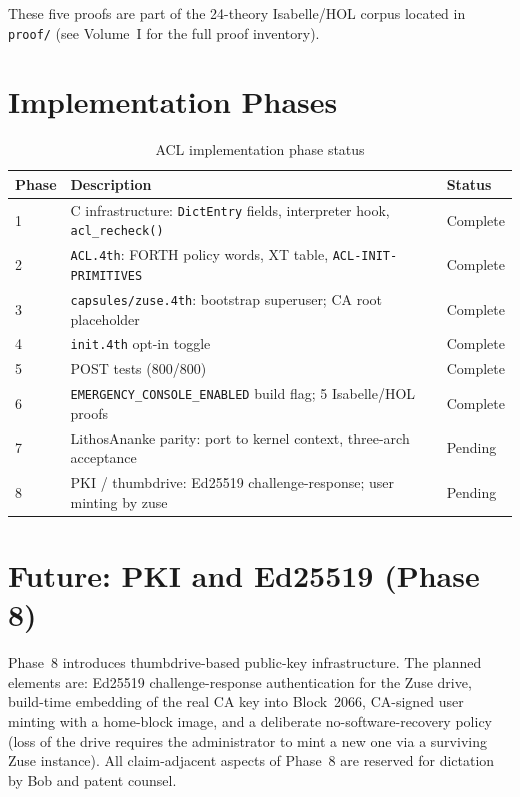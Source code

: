 These five proofs are part of the 24-theory Isabelle/HOL corpus located in
\texttt{proof/} (see Volume~I for the full proof inventory).

\section{Implementation Phases}
\label{vol2:sec:acl:phases}


\begin{table}[ht]
  \centering
  \caption{ACL implementation phase status}
  \label{tab:acl-phases}
  \begin{tabular}{lll}
    \toprule
    Phase & Description & Status \\
    \midrule
    1 & C infrastructure: \texttt{DictEntry} fields, interpreter hook,
        \texttt{acl\_recheck()} & Complete \\
    2 & \texttt{ACL.4th}: FORTH policy words, XT table, \texttt{ACL-INIT-PRIMITIVES} & Complete \\
    3 & \texttt{capsules/zuse.4th}: bootstrap superuser; CA root placeholder & Complete \\
    4 & \texttt{init.4th} opt-in toggle & Complete \\
    5 & POST tests (800/800) & Complete \\
    6 & \texttt{EMERGENCY\_CONSOLE\_ENABLED} build flag; 5 Isabelle/HOL proofs & Complete \\
    7 & LithosAnanke parity: port to kernel context, three-arch acceptance & Pending \\
    8 & PKI / thumbdrive: Ed25519 challenge-response; user minting by zuse & Pending \\
    \bottomrule
  \end{tabular}
\end{table}

\section{Future: PKI and Ed25519 (Phase 8)}
\label{vol2:sec:acl:pki}


Phase~8 introduces thumbdrive-based public-key infrastructure. The planned
elements are: Ed25519 challenge-response authentication for the Zuse drive,
build-time embedding of the real CA key into Block~2066, CA-signed user
minting with a home-block image, and a deliberate no-software-recovery
policy (loss of the drive requires the administrator to mint a new one via
a surviving Zuse instance). All claim-adjacent aspects of Phase~8 are
reserved for dictation by Bob and patent counsel.
